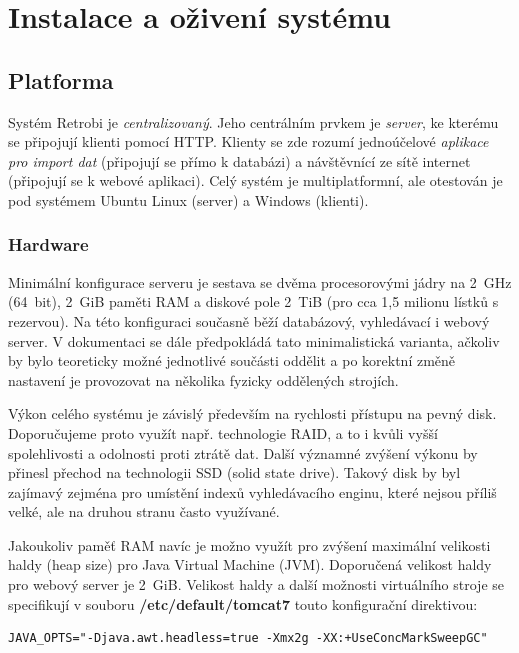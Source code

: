 \chapter{Instalace a oživení systému}

\section{Platforma}

Systém Retrobi je {\em centralizovaný}. Jeho centrálním prvkem je {\em server}, ke kterému se připojují klienti pomocí HTTP. Klienty se zde rozumí jednoúčelové {\em aplikace pro import dat} (připojují se přímo k databázi) a návštěvnící ze sítě internet (připojují se k webové aplikaci). Celý systém je multiplatformní, ale otestován je pod systémem Ubuntu Linux (server) a Windows (klienti).

\subsection{Hardware}

Minimální konfigurace serveru je sestava se dvěma procesorovými jádry na 2~GHz (64~bit), 2~GiB paměti RAM a diskové pole 2~TiB (pro cca 1,5 milionu lístků s rezervou). Na této konfiguraci současně běží databázový, vyhledávací i webový server. V dokumentaci se dále předpokládá tato minimalistická varianta, ačkoliv by bylo teoreticky možné jednotlivé součásti oddělit a po korektní změně nastavení je provozovat na několika fyzicky oddělených strojích.

Výkon celého systému je závislý především na rychlosti přístupu na pevný disk. Doporučujeme proto využít např. technologie RAID, a to i kvůli vyšší spolehlivosti a odolnosti proti ztrátě dat. Další významné zvýšení výkonu by přinesl přechod na technologii SSD (solid state drive). Takový disk by byl zajímavý zejména pro umístění indexů vyhledávacího enginu, které nejsou příliš velké, ale na druhou stranu často využívané. 

Jakoukoliv paměť RAM navíc je možno využít pro zvýšení maximální velikosti haldy (heap size) pro Java Virtual Machine (JVM). Doporučená velikost haldy pro webový server je 2~GiB. Velikost haldy a další možnosti virtuálního stroje se specifikují v souboru {\bf /etc/default/tomcat7} touto konfigurační direktivou:

\begin{verbatim}
JAVA_OPTS="-Djava.awt.headless=true -Xmx2g -XX:+UseConcMarkSweepGC"
\end{verbatim}

